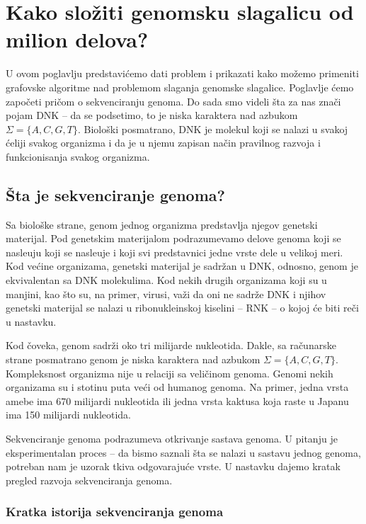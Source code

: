 \chapter{Kako složiti genomsku slagalicu od milion delova?}
\setbookcodestyle

U ovom poglavlju predstavi\'cemo dati problem i prikazati kako mo\v zemo primeniti grafovske algoritme nad problemom slaganja genomske slagalice. Poglavlje \'cemo zapo\v ceti pri\v com o sekvenciranju genoma. Do sada smo videli \v sta za nas zna\v ci pojam DNK -- da se podsetimo, to je niska karaktera nad azbukom $\Sigma = \{A, C, G, T\}$. Biolo\v ski posmatrano, DNK je molekul koji se nalazi u svakoj \'celiji svakog organizma i da je u njemu zapisan na\v cin pravilnog razvoja i funkcionisanja svakog organizma. 

\section{Šta je sekvenciranje genoma?}

Sa biološke strane, genom jednog organizma predstavlja njegov genetski materijal. Pod genetskim materijalom podrazumevamo delove genoma koji se nasle\dj uju koji se nasle\dj uje i koji svi predstavnici jedne vrste dele u velikoj meri. Kod većine organizama, genetski materijal je sadržan u DNK, odnosno, genom je ekvivalentan sa DNK molekulima. Kod nekih drugih organizama koji su u manjini, kao \v sto su, na primer, virusi, va\v zi da oni ne sadr\v ze DNK i njihov genetski materijal se nalazi u ribonukleinskoj kiselini -- RNK -- o kojoj \'ce biti re\v ci u nastavku. 

Kod čoveka, genom sadrži oko tri milijarde nukleotida. Dakle, sa računarske strane posmatrano genom je niska karaktera nad azbukom $\Sigma = \{A, C, G, T\}$. Kompleksnost organizma nije u relaciji sa veli\v cinom genoma. Genomi nekih organizama su i stotinu puta veći od humanog genoma. Na primer, jedna vrsta amebe ima 670 milijardi nukleotida ili jedna vrsta kaktusa koja raste u Japanu ima 150 milijardi nukleotida.

Sekvenciranje genoma podrazumeva otkrivanje sastava genoma. U pitanju je eksperimentalan proces -- da bismo saznali \v sta se nalazi u sastavu jednog genoma, potreban nam je uzorak tkiva odgovaraju\'ce vrste. U nastavku dajemo kratak pregled razvoja sekvenciranja genoma.

\subsection{Kratka istorija sekvenciranja genoma}

